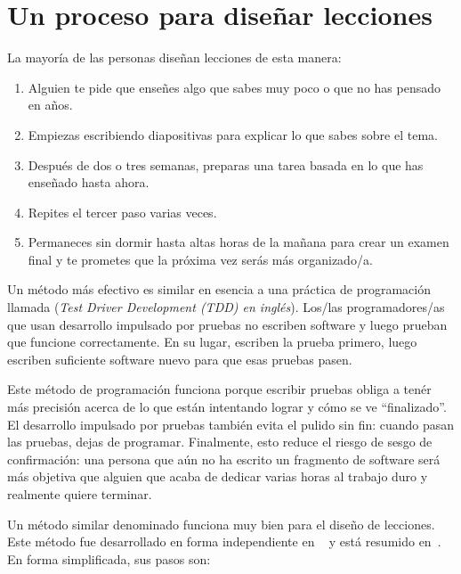 \chapter{Un proceso para diseñar lecciones}\label{s:process}

La mayoría de las personas diseñan lecciones de esta manera:
\begin{enumerate}

 \item
Alguien te pide que enseñes algo que sabes muy poco o que no has pensado en años.

 \item
Empiezas escribiendo diapositivas para explicar lo que sabes sobre el tema.

 \item
Después de dos o tres semanas,
preparas una tarea basada en lo que has enseñado hasta ahora.
 \item
Repites el tercer paso varias veces.
 \item
Permaneces sin dormir hasta altas horas de la mañana
para crear un examen final
y te prometes que la próxima vez serás más organizado/a.
\end{enumerate}

Un método más efectivo es similar en esencia a una práctica de programación llamada  (\emph{Test Driver Development (TDD) en inglés}).
Los/las programadores/as que usan desarrollo impulsado por pruebas no escriben software
y luego prueban que funcione correctamente.
En su lugar,
escriben la prueba primero,
luego escriben suficiente software nuevo para que esas pruebas pasen.
 
Este método de programación funciona porque escribir pruebas obliga a
tenér más precisión acerca de lo que están intentando lograr y cómo se ve ``finalizado''.
El desarrollo impulsado por pruebas también evita el pulido sin fin:
cuando pasan las pruebas, dejas de programar.
Finalmente,
esto reduce el riesgo de sesgo de confirmación:
una persona que aún no ha escrito un fragmento de software
será más objetiva que alguien que acaba de dedicar varias horas al trabajo duro y realmente quiere terminar.
 
Un método similar denominado  funciona muy bien para el diseño de lecciones.
Este método fue desarrollado en forma independiente en ~\cite{Wigg2005,Bigg2011,Fink2013} y está resumido en~\cite{McTi2013}.
En forma simplificada, sus pasos son:
 
